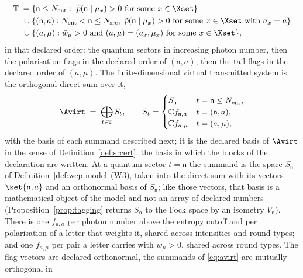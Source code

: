 \begin{definition}
\begin{enumerate}[label=(T\arabic*),leftmargin=3.0em]
\begin{equation}
\begin{aligned}
  \mathbb{T}\;=\;
  &\{\mathsf{n}\le N_{\mathrm{ent}}:\
     \tilde p(\mathsf{n}\mid\mu_x)>0\text{ for some }x\in\Xset\}\\
  \cup\;&\{(\mathsf{n},a):N_{\mathrm{ent}}<\mathsf{n}\le N_{\mathrm{src}},\
     \tilde p(\mathsf{n}\mid\mu_x)>0\text{ for some }x\in\Xset
     \text{ with }a_x=a\}\\
  \cup\;&\{(a,\mu):\tilde w_{\mu}>0\text{ and }(a,\mu)=(a_x,\mu_x)
     \text{ for some }x\in\Xset\} ,
\end{aligned}
\end{equation}
in that declared order: the quantum sectors in increasing photon number, then
the polarisation flags in the declared order of $(\mathsf{n},a)$, then the tail
flags in the declared order of $(a,\mu)$. The finite-dimensional virtual
transmitted system is the orthogonal direct sum over it,
\begin{equation}\label{eq:avirt}
  \Avirt\;=\;\bigoplus_{t\in\mathbb{T}}S_t ,\qquad
  S_t=\begin{cases}
    S_{\mathsf{n}} & t=\mathsf{n}\le N_{\mathrm{ent}},\\
    \mathbb{C}f_{\mathsf{n},a} & t=(\mathsf{n},a),\\
    \mathbb{C}f_{a,\mu} & t=(a,\mu),
  \end{cases}
\end{equation}
with the basis of each summand described next; it is the declared basis of
$\Avirt$ in the sense of Definition~\ref{def:srcert}, the basis in which
the blocks of the declaration are written. At a quantum sector
$t=\mathsf{n}$ the summand is the space $S_{\mathsf{n}}$ of
Definition~\ref{def:wcp-model}\,(W3), taken into the direct sum with its
vectors $\ket{\mathsf{n},a}$ and an orthonormal basis of $S_{\mathsf{n}}$;
like those vectors, that basis is a mathematical object of the model and not
an array of declared numbers (Proposition~\ref{prop:tagging} returns
$S_{\mathsf{n}}$ to the Fock space by an isometry $V_{\mathsf{n}}$). There is
one
$f_{\mathsf{n},a}$ per photon number above the entropy cutoff and per
polarisation of a letter that weights it, shared across intensities and round
types; and one
$f_{a,\mu}$ per pair a letter carries with
$\tilde w_{\mu}>0$, shared across round types. The flag vectors are declared
orthonormal, the summands of \eqref{eq:avirt} are mutually orthogonal in

\end{enumerate}
\end{definition}
